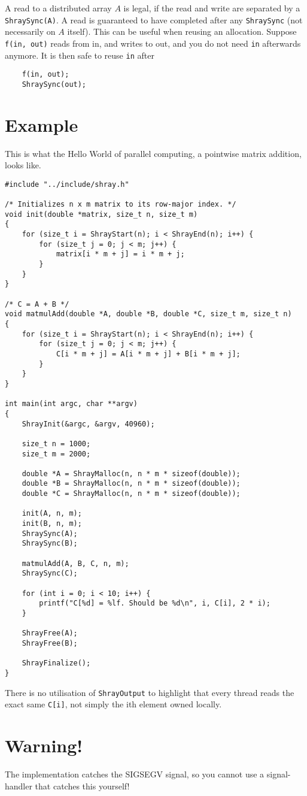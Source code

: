 \documentclass{article}
\begin{document}
\medskip

A read to a distributed array $A$ is legal, if the read and write are separated by a 
\texttt{ShraySync(A)}. A read is guaranteed to have completed after any \texttt{ShraySync}
(not necessarily on $A$ itself). This can be useful when reusing an allocation. 
Suppose \texttt{f(in, out)} reads from in, and writes to out,
and you do not need \texttt{in} afterwards anymore. It is then safe to reuse \texttt{in} after

\begin{lstlisting}
    f(in, out);
    ShraySync(out);
\end{lstlisting}

\section{Example}

This is what the Hello World of parallel computing, a pointwise matrix addition, looks like.

\begin{lstlisting}
#include "../include/shray.h"

/* Initializes n x m matrix to its row-major index. */
void init(double *matrix, size_t n, size_t m)
{
    for (size_t i = ShrayStart(n); i < ShrayEnd(n); i++) {
        for (size_t j = 0; j < m; j++) {
            matrix[i * m + j] = i * m + j;
        }
    }
}

/* C = A + B */
void matmulAdd(double *A, double *B, double *C, size_t m, size_t n)
{    
    for (size_t i = ShrayStart(n); i < ShrayEnd(n); i++) {
        for (size_t j = 0; j < m; j++) {
            C[i * m + j] = A[i * m + j] + B[i * m + j];
        }
    }
}

int main(int argc, char **argv)
{
    ShrayInit(&argc, &argv, 40960);

    size_t n = 1000;
    size_t m = 2000;

    double *A = ShrayMalloc(n, n * m * sizeof(double));
    double *B = ShrayMalloc(n, n * m * sizeof(double));
    double *C = ShrayMalloc(n, n * m * sizeof(double));

    init(A, n, m);
    init(B, n, m);
    ShraySync(A);
    ShraySync(B);

    matmulAdd(A, B, C, n, m);
    ShraySync(C);

    for (int i = 0; i < 10; i++) {
        printf("C[%d] = %lf. Should be %d\n", i, C[i], 2 * i);
    }

    ShrayFree(A);
    ShrayFree(B);

    ShrayFinalize();
}
\end{lstlisting}

There is no utilisation of \texttt{ShrayOutput} to highlight that every thread reads the
exact same \texttt{C[i]}, not simply the ith element owned locally. 

\section{Warning!}

The implementation catches the SIGSEGV signal, so you cannot use a signal-handler that 
catches this yourself!
\end{document}
